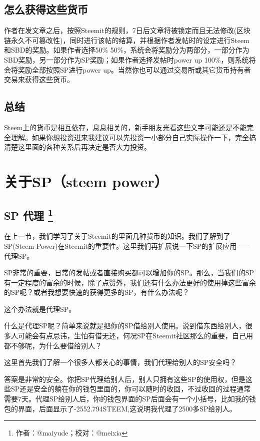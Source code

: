 \documentclass[]{ctexbook}
\begin{document}
\subsection{怎么获得这些货币}

作者在发文章之后，按照Steemit的规则，7日后文章将被锁定而且无法修改(区块链永久不可篡改性)，同时进行该帖的结算，并根据作者发帖时的设定进行Steem和SBD的奖励。如果作者选择50\% 50\%，系统会将奖励分为两部分，一部分作为SBD奖励，另一部分作为SP奖励；如果作者选择发帖时power up 100\%，则系统将会将奖励全部按照SP进行power up。当然你也可以通过交易所或其它货币持有者交易来获得这些货币。

\subsection{总结}

Steem上的货币是相互依存，息息相关的，新手朋友光看这些文字可能还是不能完全理解。如果你想投资进来我建议可以先投资一小部分自己实际操作一下，完全搞清楚这里面的各种关系后再决定是否大力投资。

\hypertarget{about-sp}{%
\section{关于SP（steem power）}\label{about-sp}}

\hypertarget{sp-}{%
\subsection[SP 代理 ]{\texorpdfstring{SP 代理 \footnote{作者：@maiyude；校对：@meixia}}{SP 代理 }}\label{sp-}}

在上一节，我们学习了关于Steemit的里面几种货币的知识。我们了解到了SP(Steem Power)在Steemit的重要性。这里我们再扩展说一下SP的扩展应用------代理SP。

SP非常的重要，日常的发帖或者直接购买都可以增加你的SP。那么，当我们的SP有一定程度的富余的时候，除了点赞外，我们还有什么办法更好的使用掉这些富余的SP呢？或者我想要快速的获得更多的SP，有什么办法呢？

这个办法就是代理SP。

什么是代理SP呢？简单来说就是把你的SP借给别人使用。说到借东西给别人，很多人可能会有点忌讳，生怕有借无还，何况SP在Steemit社区那么的重要，自己用都不够呢，为什么要借给别人？

这里首先我们了解一个很多人都关心的事情，我们代理给别人的SP安全吗？

答案是非常的安全。你把SP代理给别人后，别人只拥有这些SP的使用权，但是这些SP还是安全的躺在你的钱包里面的，你可以随时的收回，不过收回的过程通常需要7天。代理SP给别人后，你的钱包界面的SP后面会有一个小括号，比如我的钱包的界面，后面显示了-2552.794STEEM,这说明我代理了2500多SP给别人。
\end{document}
